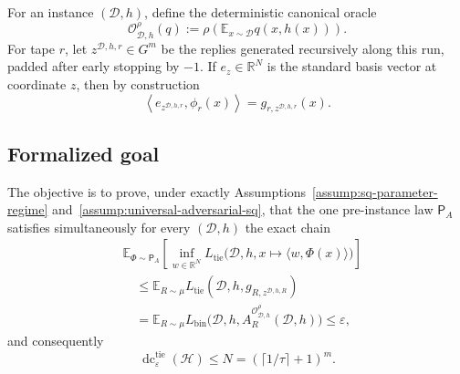 For an instance \((\mathcal D,h)\), define the deterministic canonical
oracle
\[
\mathcal O^\rho_{\mathcal D,h}(q)
:=\rho\!\left(
\mathbb E_{x\sim\mathcal D}q(x,h(x))
\right).
\tag{7}\label{eq:canonical-oracle}
\]
For tape \(r\), let \(z^{\mathcal D,h,r}\in G^m\) be the replies generated
recursively along this run, padded after early stopping by \(-1\).  If
\(e_z\in\mathbb R^N\) is the standard basis vector at coordinate \(z\),
then by construction
\[
\left\langle e_{z^{\mathcal D,h,r}},\phi_r(x)\right\rangle
=g_{r,z^{\mathcal D,h,r}}(x).
\tag{8}\label{eq:setup-coordinate-identity}
\]

\subsection{Formalized goal}

The objective is to prove, under exactly
Assumptions~\ref{assump:sq-parameter-regime}
and~\ref{assump:universal-adversarial-sq}, that the one pre-instance law
\(\mathsf P_A\) satisfies simultaneously for every \((\mathcal D,h)\)
the exact chain
\[
\begin{aligned}
&\mathbb E_{\Phi\sim\mathsf P_A}
\left[
\inf_{w\in\mathbb R^N}
L_{\mathrm{tie}}\bigl(
\mathcal D,h,x\mapsto\langle w,\Phi(x)\rangle
\bigr)
\right]\\
&\quad\le
\mathbb E_{R\sim\mu}
L_{\mathrm{tie}}(\mathcal D,h,g_{R,z^{\mathcal D,h,R}})\\
&\quad=
\mathbb E_{R\sim\mu}
L_{\mathrm{bin}}\bigl(
\mathcal D,h,
A_R^{\mathcal O^\rho_{\mathcal D,h}}(\mathcal D,h)
\bigr)
\le\varepsilon,
\end{aligned}
\tag{9}\label{eq:formalized-goal-chain}
\]
and consequently
\[
\operatorname{dc}^{\mathrm{tie}}_\varepsilon(\mathcal H)
\le N=(\lceil1/\tau\rceil+1)^m.
\tag{10}\label{eq:formalized-goal-dimension}
\]
